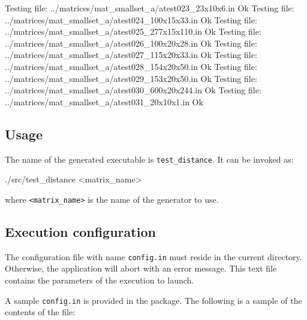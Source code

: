 \documentclass[]{article}
\newenvironment{Shaded}{}{}
\newcommand{\ExtensionTok}[1]{#1}
\newcommand{\NormalTok}[1]{#1}
\newcommand{\OperatorTok}[1]{\textcolor[rgb]{0.40,0.40,0.40}{#1}}
\begin{document}
\begin{Shaded}
\begin{Highlighting}[]
\ExtensionTok{Testing}\NormalTok{ file:  ../matrices/mat_smallset_a/atest023_23x10x6.in     Ok}
\ExtensionTok{Testing}\NormalTok{ file:  ../matrices/mat_smallset_a/atest024_100x15x33.in     Ok}
\ExtensionTok{Testing}\NormalTok{ file:  ../matrices/mat_smallset_a/atest025_277x15x110.in     Ok}
\ExtensionTok{Testing}\NormalTok{ file:  ../matrices/mat_smallset_a/atest026_100x20x28.in     Ok}
\ExtensionTok{Testing}\NormalTok{ file:  ../matrices/mat_smallset_a/atest027_115x20x33.in     Ok}
\ExtensionTok{Testing}\NormalTok{ file:  ../matrices/mat_smallset_a/atest028_154x20x50.in     Ok}
\ExtensionTok{Testing}\NormalTok{ file:  ../matrices/mat_smallset_a/atest029_153x20x50.in     Ok}
\ExtensionTok{Testing}\NormalTok{ file:  ../matrices/mat_smallset_a/atest030_600x20x244.in     Ok}
\ExtensionTok{Testing}\NormalTok{ file:  ../matrices/mat_smallset_a/atest031_20x10x1.in     Ok}
\end{Highlighting}
\end{Shaded}

\hypertarget{usage}{%
\subsection{Usage}\label{usage}}

The name of the generated executable is \texttt{test\_distance}. It can
be invoked as:

\begin{Shaded}
\begin{Highlighting}[]
\ExtensionTok{./src/test_distance} \OperatorTok{<}\NormalTok{matrix_name}\OperatorTok{>}
\end{Highlighting}
\end{Shaded}

where \texttt{\textless{}matrix\_name\textgreater{}} is the name of the
generator to use.

\hypertarget{execution-configuration}{%
\subsection{Execution configuration}\label{execution-configuration}}

The configuration file with name \texttt{config.in} must reside in the
current directory. Otherwise, the application will abort with an error
message. This text file contains the parameters of the execution to
launch.

A sample \texttt{config.in} is provided in the package. The following is
a sample of the contents of the file:
\end{document}
